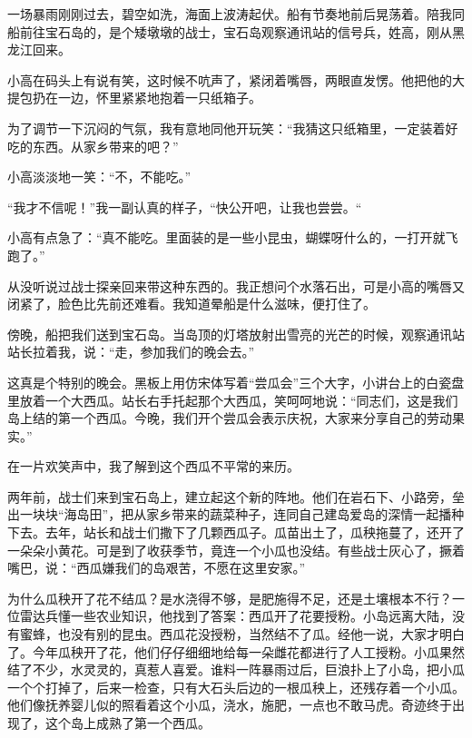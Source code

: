 \documentclass[12pt,UTF-8,openany]{ctexbook}
\begin{document}
\begin{large}
    
    一场暴雨刚刚过去，碧空如洗，海面上波涛起伏。船有节奏地前后晃荡着。陪我同船前往宝石岛的，是个矮墩墩的战士，宝石岛观察通讯站的信号兵，姓高，刚从黑龙江回来。
    
    小高在码头上有说有笑，这时候不吭声了，紧闭着嘴唇，两眼直发愣。他把他的大提包扔在一边，怀里紧紧地抱着一只纸箱子。
    
    为了调节一下沉闷的气氛，我有意地同他开玩笑：“我猜这只纸箱里，一定装着好吃的东西。从家乡带来的吧？”
    
    小高淡淡地一笑：“不，不能吃。”
    
    “我才不信呢！”我一副认真的样子，“快公开吧，让我也尝尝。“
    
    小高有点急了：“真不能吃。里面装的是一些小昆虫，蝴蝶呀什么的，一打开就飞跑了。”
    
    从没听说过战士探亲回来带这种东西的。我正想问个水落石出，可是小高的嘴唇又闭紧了，脸色比先前还难看。我知道晕船是什么滋味，便打住了。
    
    傍晚，船把我们送到宝石岛。当岛顶的灯塔放射出雪亮的光芒的时候，观察通讯站站长拉着我，说：“走，参加我们的晚会去。”
    
    这真是个特别的晚会。黑板上用仿宋体写着“尝瓜会”三个大字，小讲台上的白瓷盘里放着一个大西瓜。站长右手托起那个大西瓜，笑呵呵地说：“同志们，这是我们岛上结的第一个西瓜。今晚，我们开个尝瓜会表示庆祝，大家来分享自己的劳动果实。”
    
    在一片欢笑声中，我了解到这个西瓜不平常的来历。
    
    两年前，战士们来到宝石岛上，建立起这个新的阵地。他们在岩石下、小路旁，垒出一块块“海岛田”，把从家乡带来的蔬菜种子，连同自己建岛爱岛的深情一起播种下去。去年，站长和战士们撒下了几颗西瓜子。瓜苗出土了，瓜秧拖蔓了，还开了一朵朵小黄花。可是到了收获季节，竟连一个小瓜也没结。有些战士灰心了，撅着嘴巴，说：“西瓜嫌我们的岛艰苦，不愿在这里安家。”
    
    为什么瓜秧开了花不结瓜？是水浇得不够，是肥施得不足，还是土壤根本不行？一位雷达兵懂一些农业知识，他找到了答案：西瓜开了花要授粉。小岛远离大陆，没有蜜蜂，也没有别的昆虫。西瓜花没授粉，当然结不了瓜。经他一说，大家才明白了。今年瓜秧开了花，他们仔仔细细地给每一朵雌花都进行了人工授粉。小瓜果然结了不少，水灵灵的，真惹人喜爱。谁料一阵暴雨过后，巨浪扑上了小岛，把小瓜一个个打掉了，后来一检查，只有大石头后边的一根瓜秧上，还残存着一个小瓜。他们像抚养婴儿似的照看着这个小瓜，浇水，施肥，一点也不敢马虎。奇迹终于出现了，这个岛上成熟了第一个西瓜。
    

\end{large}
\end{document}
